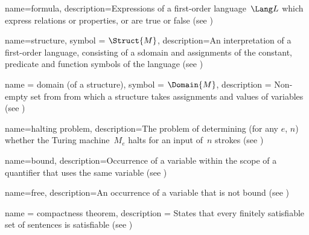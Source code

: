  {
  name={formula},  
  description={Expressions of a first-order language~$\Lang L$ which
    express relations or properties, or are true or false (see
    )} }

 {
  name={structure},
  symbol = {\ensuremath{\Struct{M}}},
  description={An interpretation of a first-order language, consisting
    of a \gls{sdomain} and assignments of the constant,
    predicate and function symbols of the language (see
    )} }

 {
  name = {domain (of a structure)},
  symbol = {\ensuremath{\Domain{M}}},
  description = {Non-empty set from from which a \gls{structure} takes
    assignments and values of {variables} (see
    )} }
 
 {
  name=halting problem,
  description={The problem of determining (for any $e$, $n$) whether
    the Turing machine~$M_e$ halts for an input of~$n$ strokes (see
    )} }

 {
  name=bound,
  description={Occurrence of a variable
    within the scope of a quantifier that uses the same
    variable (see )}
}

 {
  name=free,
    description={An occurrence of a variable that is not \gls{bound}
    (see )}
}

 {
  name = {compactness theorem},  
  description = {States that every \gls{finitely satisfiable} set of
    sentences is satisfiable (see
    )}}




